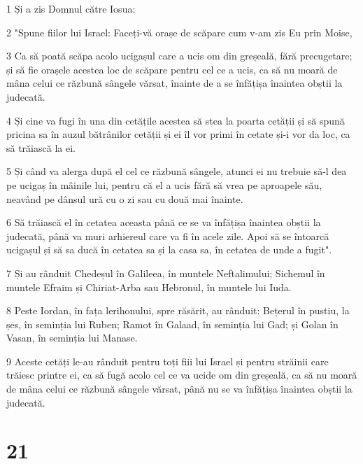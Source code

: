 \par 1 Și a zis Domnul către Iosua:
\par 2 "Spune fiilor lui Israel: Faceți-vă orașe de scăpare cum v-am zis Eu prin Moise,
\par 3 Ca să poată scăpa acolo ucigașul care a ucis om din greșeală, fără precugetare; și să fie orașele acestea loc de scăpare pentru cel ce a ucis, ca să nu moară de mâna celui ce răzbună sângele vărsat, înainte de a se înfățișa înaintea obștii la judecată.
\par 4 Și cine va fugi în una din cetățile acestea să stea la poarta cetății și să spună pricina sa în auzul bătrânilor cetății și ei îl vor primi în cetate și-i vor da loc, ca să trăiască la ei.
\par 5 Și când va alerga după el cel ce răzbună sângele, atunci ei nu trebuie să-l dea pe ucigaș în mâinile lui, pentru că el a ucis fără să vrea pe aproapele său, neavând pe dânsul ură cu o zi sau cu două mai înainte.
\par 6 Să trăiască el în cetatea aceasta până ce se va înfățișa înaintea obștii la judecată, până va muri arhiereul care va fi în acele zile. Apoi să se întoarcă ucigașul și să sa ducă în cetatea sa și la casa sa, în cetatea de unde a fugit".
\par 7 Și au rânduit Chedeșul în Galileea, în muntele Neftalimului; Sichemul în muntele Efraim și Chiriat-Arba sau Hebronul, în muntele lui Iuda.
\par 8 Peste Iordan, în fața lerihonului, spre răsărit, au rânduit: Bețerul în pustiu, la șes, în seminția lui Ruben; Ramot în Galaad, în seminția lui Gad; și Golan în Vasan, în seminția lui Manase.
\par 9 Aceste cetăți le-au rânduit pentru toți fiii lui Israel și pentru străinii care trăiesc printre ei, ca să fugă acolo cel ce va ucide om din greșeală, ca să nu moară de mâna celui ce răzbună sângele vărsat, până nu se va înfățișa înaintea obștii la judecată.

\chapter{21}

